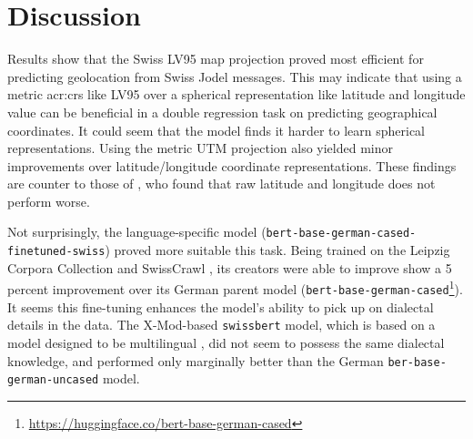 \section{Discussion}
\label{sec:Discussion}

\begin{comment}
It is important to include a discussion, which describes what you have learned so far, the merits of the work as well as its limitations.
It can be a separate section or it can appear together with the results or be part of the conclusion).
When evaluating your results, avoid drawing grand conclusions, beyond those that your results can in fact support.
Further, although you may have designed your experiments to answer certain questions,
the results may raise other questions in the eyes of the reader.
It is important that you study the graphs/tables to look for unusual features/entries, and discuss these as well as the main findings.
In particular, carry out an error analysis: b went wrong and why?
\end{comment}

Results show that the Swiss LV95 map projection proved most efficient for predicting geolocation from Swiss Jodel messages. This may indicate that using a metric \gls{acr:crs} like LV95 over a spherical representation like latitude and longitude value can be beneficial in a double regression task on predicting geographical coordinates. It could seem that the model finds it harder to learn spherical representations. Using the metric UTM projection also yielded minor improvements over latitude/longitude coordinate representations. These findings are counter to those of \cite[5]{scherrerHeLjuVarDial20202020}, who found that raw latitude and longitude does not perform worse.

Not surprisingly, the language-specific model (\texttt{bert-base-german-cased-finetuned-swiss}) proved more suitable this task. Being trained on the Leipzig Corpora Collection \citep{goldhahnBuildingLargeMonolingual} and SwissCrawl \citep{linderAutomaticCreationText2020}, its creators were able to improve show a 5 percent improvement over its German parent model (\texttt{bert-base-german-cased}\footnote{\url{https://huggingface.co/bert-base-german-cased}}). It seems this fine-tuning enhances the model's ability to pick up on dialectal details in the data. The X-Mod-based \texttt{swissbert} model, which is based on a model designed to be multilingual \citep{pfeifferLiftingCurseMultilinguality2022}, did not seem to possess the same dialectal knowledge, and performed only marginally better than the German \texttt{ber-base-german-uncased} model.

